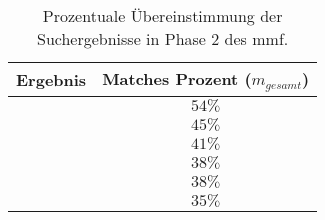 \begin{table}[!h]
  \centering
  \begin{tabular}{l c}
    \toprule
    \textbf{Ergebnis} & \textbf{Matches Prozent ($m_{gesamt}$)} \\ \midrule
    \cite{arh-result-no-filter-1} & $54\%$ \\ \hline
    \cite{arh-result-no-filter-3} & $45\%$ \\ \hline
    \cite{arh-result-no-filter-2} & $41\%$ \\ \hline
    \cite{arh-result-no-filter-4} & $38\%$ \\ \hline
    \cite{arh-result-no-filter-5} & $38\%$ \\ \hline
    \cite{arh-result-important-filter-4} & $35\%$ \\
    \bottomrule
  \end{tabular}
  \caption[Prozentuale Übereinstimmung der Suchergebnisse in Phase 2 des \gls{mmf}]{
   	Prozentuale Übereinstimmung der Suchergebnisse in Phase 2 des \gls{mmf}.
  }
  \label{tab:phase2-ranking}
\end{table}